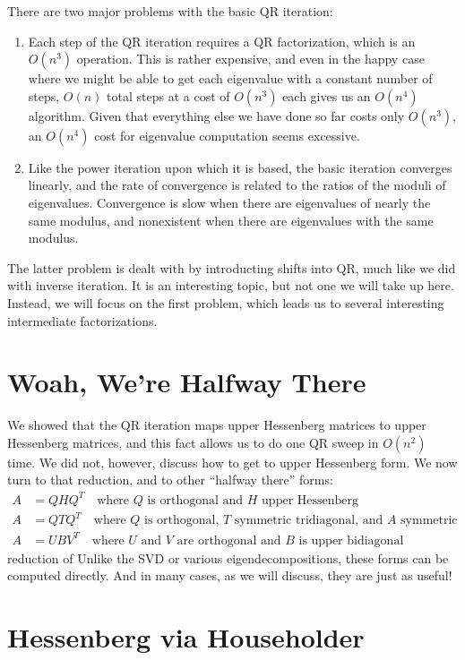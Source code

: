 \documentclass[12pt, leqno]{article}
\begin{document}
There are two major problems with the basic QR iteration:
\begin{enumerate}
\item
  Each step of the QR iteration requires a QR factorization, which is
  an $O(n^3)$ operation.  This is rather expensive, and even in the happy
  case where we might be able to get each eigenvalue with a constant
  number of steps, $O(n)$ total steps at a cost of $O(n^3)$ each gives
  us an $O(n^4)$ algorithm.  Given that everything else we have done
  so far costs only $O(n^3)$, an $O(n^4)$ cost for eigenvalue computation
  seems excessive.
\item
  Like the power iteration upon which it is based, the basic iteration
  converges linearly, and the rate of convergence is related to the
  ratios of the moduli of eigenvalues.  Convergence is slow when there
  are eigenvalues of nearly the same modulus, and nonexistent when
  there are eigenvalues with the same modulus.
\end{enumerate}
The latter problem is dealt with by introducting shifts into QR,
much like we did with inverse iteration.  It is an interesting topic,
but not one we will take up here.  Instead, we will focus on the first
problem, which leads us to several interesting intermediate factorizations.

\section{Woah, We're Halfway There}

We showed that the QR iteration maps upper Hessenberg
matrices to upper Hessenberg matrices, and this fact allows us to do
one QR sweep in $O(n^2)$ time.  We did not, however, discuss how to
get to upper Hessenberg form.  We now turn to that
reduction, and to other ``halfway there'' forms:
\begin{align*}
  A &= Q H Q^T \quad \mbox{where $Q$ is orthogonal and $H$ upper
    Hessenberg} \\
  A &= Q T Q^T \quad \mbox{where $Q$ is orthogonal, $T$ symmetric
    tridiagonal, and $A$ symmetric} \\
  A &= U B V^T \quad \mbox{where $U$ and $V$ are orthogonal and $B$ is
    upper bidiagonal}
\end{align*}
reduction of
Unlike the SVD or various eigendecompositions, these forms can be
computed directly.  And in many cases, as we will discuss, they are
just as useful!

\section{Hessenberg via Householder}
\end{document}
